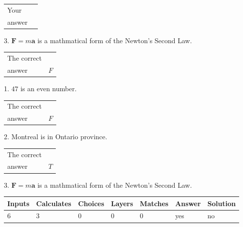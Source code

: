 \documentclass[12pt]{article}
\begin{document}
\noindent\begin{tabular}{|l|l|}\hline Your&\hspace{.2in} \\ answer&\hspace{.2in} \\ \hline \end{tabular}
3.  %
$\mathbf{F}=m\mathbf{a}$ is a mathmatical form of
the Newton's Second Law.
 
 
 
\noindent{}
 
 

 
\noindent\begin{tabular}{|l|l|}\hline The correct & \\
          answer &  %
$F$ \\ \hline \end{tabular}
1. $ %
47$ is an  %
even number.
 
\noindent\begin{tabular}{|l|l|}\hline The correct & \\
          answer &  %
$F$ \\ \hline \end{tabular}
2.  %
Montreal is in  %
Ontario province.
 
\noindent\begin{tabular}{|l|l|}\hline The correct & \\
          answer &  %
$T$ \\ \hline \end{tabular}
3.  %
$\mathbf{F}=m\mathbf{a}$ is a mathmatical form of  %
the Newton's Second Law.
 
 
 
\noindent{}
 
 

 
\vspace{0.3in}
   
   
   
   
\noindent\begin{tabular}{|l|l|l|l|l|l|l|}
 \hline
Inputs & Calculates & Choices & Layers & Matches & Answer & Solution \\ \hline
           6 & 
           3 & 
           0
  & 
           0 & 
           0 & 
  yes & 
  no 
  \\ \hline
 \end{tabular}
   
\end{document}
